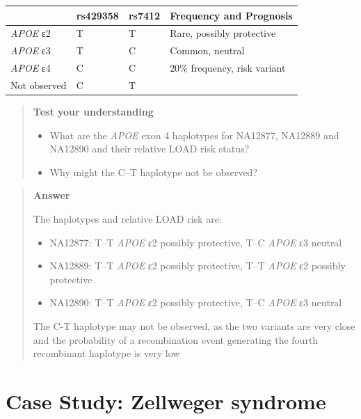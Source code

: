 \documentclass[
  letterpaper,
  DIV=11,
  numbers=noendperiod]{scrreprt}
\newcounter{none} %
\providecommand{\tightlist}{%
  \setlength{\itemsep}{0pt}\setlength{\parskip}{0pt}}
\begin{document}
\begin{tcolorbox}
{\def\LTcaptype{none} %
\begin{longtable}[]{@{}llll@{}}
\toprule\noalign{}
& rs429358 & rs7412 & Frequency and Prognosis \\
\midrule\noalign{}
\endhead
\bottomrule\noalign{}
\endlastfoot
\emph{APOE} ε2 & T & T & Rare, possibly protective \\
\emph{APOE} ε3 & T & C & Common, neutral \\
\emph{APOE} ε4 & C & C & 20\% frequency, risk variant \\
Not observed & C & T & \\
\end{longtable}
}

\begin{quote}
\textbf{Test your understanding}

\begin{itemize}
\tightlist
\item
  What are the \emph{APOE} exon 4 haplotypes for NA12877, NA12889 and
  NA12890 and their relative LOAD risk status?
\item
  Why might the C--T haplotype not be observed?
\end{itemize}
\end{quote}

\begin{quote}
\textbf{Answer}

The haplotypes and relative LOAD risk are:

\begin{itemize}
\tightlist
\item
  NA12877: T--T \emph{APOE} ε2 possibly protective, T--C \emph{APOE} ε3
  neutral
\item
  NA12889: T--T \emph{APOE} ε2 possibly protective, T--T \emph{APOE} ε2
  possibly protective
\item
  NA12890: T--T \emph{APOE} ε2 possibly protective, T--C \emph{APOE} ε3
  neutral
\end{itemize}

The C-T haplotype may not be observed, as the two variants are very
close and the probability of a recombination event generating the fourth
recombinant haplotype is very low
\end{quote}


\chapter{Case Study: Zellweger
syndrome}\label{case-study-zellweger-syndrome}


\end{tcolorbox}
\end{document}
